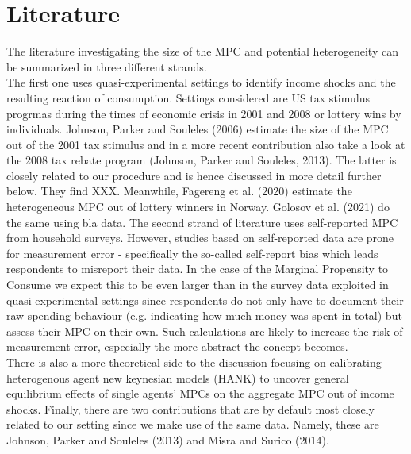 \section*{Literature}
The literature investigating the size of the MPC and potential heterogeneity can be summarized in three different strands. \\
The first one uses quasi-experimental settings to identify income shocks and the resulting reaction of consumption. Settings considered are US tax stimulus progrmas during the times of economic crisis in 2001 and 2008 or lottery wins by individuals. Johnson, Parker and Souleles (2006) estimate the size of the MPC out of the 2001 tax stimulus and in a more recent contribution also take a look at the 2008 tax rebate program (Johnson, Parker and Souleles, 2013). The latter is closely related to our procedure and is hence discussed in more detail further below. They find XXX. Meanwhile, Fagereng et al. (2020) estimate the heterogeneous MPC out of lottery winners in Norway. Golosov et al. (2021) do the same using bla data. 
The second strand of literature uses self-reported MPC from household surveys. 
However, studies based on self-reported data are prone for measurement error - specifically the so-called self-report bias which leads respondents to misreport their data. In the case of the Marginal Propensity to Consume we expect this to be even larger than in the survey data exploited in quasi-experimental settings since respondents do not only have to document their raw spending behaviour (e.g. indicating how much money was spent in total) but assess their MPC on their own. Such calculations are likely to increase the risk of measurement error, especially the more abstract the concept becomes. \\
There is also a more theoretical side to the discussion focusing on calibrating heterogenous agent new keynesian models (HANK) to uncover general equilibrium effects of single agents' MPCs on the aggregate MPC out of income shocks.
Finally, there are two contributions that are by default most closely related to our setting since we make use of the same data. Namely, these are Johnson, Parker and Souleles (2013) and Misra and Surico (2014). 
